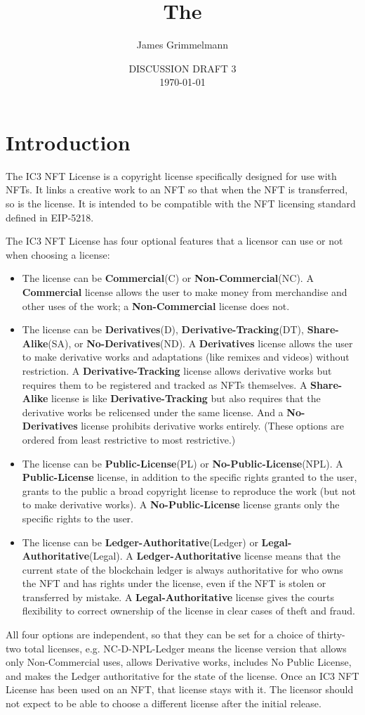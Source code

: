 \documentclass{article}
\title{The \iccclicense\\}
\author{James Grimmelmann}
\affil{Cornell Tech and Cornell Law School\\Institute for Cryptocurrencies and Contracts}
\date{DISCUSSION DRAFT 3\\\today}
\newcommand{\eiplicense}{EIP-5218\xspace}
\newcommand{\iccclicense}{IC3 NFT License\xspace}
\newcommand{\keyword}[1]{\textbf{#1}\xspace}
\newcommand{\publiclicense}{\keyword{Public-License}}
\newcommand{\nopubliclicense}{\keyword{No-Public-License}}
\newcommand{\commercial}{\keyword{Commercial}}
\newcommand{\noncommercial}{\keyword{Non-Commercial}}
\newcommand{\derivative}{\keyword{Derivatives}}
\newcommand{\sharealike}{\keyword{Share-Alike}}
\newcommand{\derivativetracking}{\keyword{Derivative-Tracking}}
\newcommand{\noderivative}{\keyword{No-Derivatives}}
\newcommand{\ledger}{\keyword{Ledger-Authoritative}}
\newcommand{\legal}{\keyword{Legal-Authoritative}}
\begin{document}
\maketitle

\tableofcontents

\section{Introduction}

The \iccclicense is a copyright license specifically designed for use with NFTs. It links a creative work to an NFT so that when the NFT is transferred, so is the license. It is intended to be compatible with the NFT licensing standard defined in \eiplicense. 

The \iccclicense has four optional features that a licensor can use or not when choosing a license:
\begin{itemize}
\item The license can be \commercial (C) or \noncommercial (NC). A \commercial license allows the user to make money from merchandise and other uses of the work; a \noncommercial license does not.
\item The license can be \derivative (D), \derivativetracking (DT), \sharealike (SA), or \noderivative (ND). A \derivative license allows the user to make derivative works and adaptations (like remixes and videos) without restriction. A \derivativetracking license allows derivative works but requires them to be registered and tracked as NFTs themselves. A \sharealike license is like \derivativetracking but also requires that the derivative works be relicensed under the same license. And a \noderivative license prohibits derivative works entirely. (These options are ordered from least restrictive to most restrictive.)
\item The license can be \publiclicense (PL) or \nopubliclicense (NPL). A \publiclicense license, in addition to the specific rights granted to the user, grants to the public a broad copyright license to reproduce the work (but not to make derivative works). A \nopubliclicense license grants only the specific rights to the user.
\item The license can be \ledger (Ledger) or \legal (Legal). A \ledger license means that the current state of the blockchain ledger is always authoritative for who owns the NFT and has rights under the license, even if the NFT is stolen or transferred by mistake. A \legal license gives the courts flexibility to correct ownership of the license in clear cases of theft and fraud.
\end{itemize}
All four options are independent, so that they can be set for a choice of thirty-two total licenses, e.g. NC-D-NPL-Ledger means the license version that allows only Non-Commercial uses, allows Derivative works, includes No Public License, and makes the Ledger authoritative for the state of the license. Once an \iccclicense has been used on an NFT, that license stays with it. The licensor should not expect to be able to choose a different license after the initial release.
\end{document}
